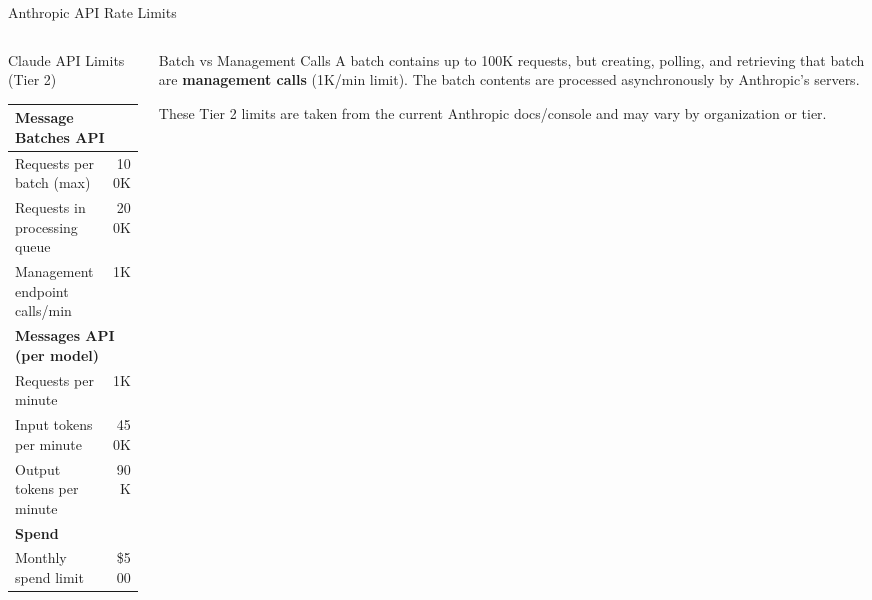 \documentclass[
        11pt,
        compress,
        xcolor={dvipsnames}
    ]{beamer}
\begin{document}
\begin{frame}{Anthropic API Rate Limits}
  \begin{columns}[T]
    \begin{column}{0.55\textwidth}
      \begin{block}{Claude API Limits (Tier 2)}
        \scriptsize
        \begin{tabular}{lr}
          \multicolumn{2}{l}{\textbf{Message Batches API}} \\
          \midrule
          Requests per batch (max)              & 100K \\
          Requests in processing queue          & 200K \\
          Management endpoint calls/min         & 1K \\[0.5em]
          \multicolumn{2}{l}{\textbf{Messages API (per model)}} \\
          \midrule
          Requests per minute                   & 1K \\
          Input tokens per minute               & 450K \\
          Output tokens per minute              & 90K \\[0.5em]
          \multicolumn{2}{l}{\textbf{Spend}} \\
          \midrule
          Monthly spend limit                   & \$500 \\
        \end{tabular}
      \end{block}
    \end{column}
    \begin{column}{0.45\textwidth}
      \begin{block}{Batch vs Management Calls}
        \scriptsize
        A batch contains up to 100K requests, but creating, polling, and
        retrieving that batch are \textbf{management calls} (1K/min limit).
        The batch contents are processed asynchronously by Anthropic's servers.
      \end{block}
      \vspace{0.2em}
      \scriptsize
      These Tier 2 limits are taken from the current Anthropic docs/console and may vary by organization or tier.
    \end{column}
  \end{columns}
\end{frame}
\end{document}
